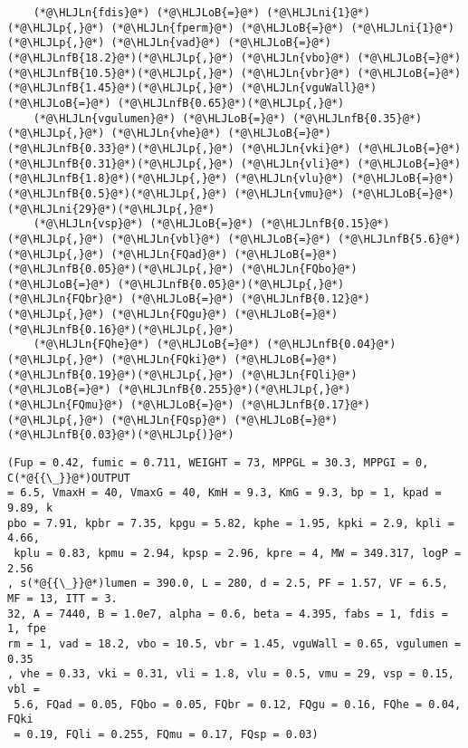 \documentclass[12pt,a4paper]{article}
\newcommand{\HLJLn}[1]{#1}
\newcommand{\HLJLnfB}[1]{\textcolor[RGB]{59,151,46}{#1}}
\newcommand{\HLJLni}[1]{\textcolor[RGB]{59,151,46}{#1}}
\newcommand{\HLJLoB}[1]{\textcolor[RGB]{102,102,102}{\textbf{#1}}}
\newcommand{\HLJLp}[1]{#1}
\begin{document}
\begin{lstlisting}
    (*@\HLJLn{fdis}@*) (*@\HLJLoB{=}@*) (*@\HLJLni{1}@*)(*@\HLJLp{,}@*) (*@\HLJLn{fperm}@*) (*@\HLJLoB{=}@*) (*@\HLJLni{1}@*)(*@\HLJLp{,}@*) (*@\HLJLn{vad}@*) (*@\HLJLoB{=}@*) (*@\HLJLnfB{18.2}@*)(*@\HLJLp{,}@*) (*@\HLJLn{vbo}@*) (*@\HLJLoB{=}@*) (*@\HLJLnfB{10.5}@*)(*@\HLJLp{,}@*) (*@\HLJLn{vbr}@*) (*@\HLJLoB{=}@*) (*@\HLJLnfB{1.45}@*)(*@\HLJLp{,}@*) (*@\HLJLn{vguWall}@*) (*@\HLJLoB{=}@*) (*@\HLJLnfB{0.65}@*)(*@\HLJLp{,}@*)
    (*@\HLJLn{vgulumen}@*) (*@\HLJLoB{=}@*) (*@\HLJLnfB{0.35}@*)(*@\HLJLp{,}@*) (*@\HLJLn{vhe}@*) (*@\HLJLoB{=}@*) (*@\HLJLnfB{0.33}@*)(*@\HLJLp{,}@*) (*@\HLJLn{vki}@*) (*@\HLJLoB{=}@*) (*@\HLJLnfB{0.31}@*)(*@\HLJLp{,}@*) (*@\HLJLn{vli}@*) (*@\HLJLoB{=}@*) (*@\HLJLnfB{1.8}@*)(*@\HLJLp{,}@*) (*@\HLJLn{vlu}@*) (*@\HLJLoB{=}@*) (*@\HLJLnfB{0.5}@*)(*@\HLJLp{,}@*) (*@\HLJLn{vmu}@*) (*@\HLJLoB{=}@*) (*@\HLJLni{29}@*)(*@\HLJLp{,}@*)
    (*@\HLJLn{vsp}@*) (*@\HLJLoB{=}@*) (*@\HLJLnfB{0.15}@*)(*@\HLJLp{,}@*) (*@\HLJLn{vbl}@*) (*@\HLJLoB{=}@*) (*@\HLJLnfB{5.6}@*)(*@\HLJLp{,}@*) (*@\HLJLn{FQad}@*) (*@\HLJLoB{=}@*) (*@\HLJLnfB{0.05}@*)(*@\HLJLp{,}@*) (*@\HLJLn{FQbo}@*) (*@\HLJLoB{=}@*) (*@\HLJLnfB{0.05}@*)(*@\HLJLp{,}@*) (*@\HLJLn{FQbr}@*) (*@\HLJLoB{=}@*) (*@\HLJLnfB{0.12}@*)(*@\HLJLp{,}@*) (*@\HLJLn{FQgu}@*) (*@\HLJLoB{=}@*) (*@\HLJLnfB{0.16}@*)(*@\HLJLp{,}@*)
    (*@\HLJLn{FQhe}@*) (*@\HLJLoB{=}@*) (*@\HLJLnfB{0.04}@*)(*@\HLJLp{,}@*) (*@\HLJLn{FQki}@*) (*@\HLJLoB{=}@*) (*@\HLJLnfB{0.19}@*)(*@\HLJLp{,}@*) (*@\HLJLn{FQli}@*) (*@\HLJLoB{=}@*) (*@\HLJLnfB{0.255}@*)(*@\HLJLp{,}@*) (*@\HLJLn{FQmu}@*) (*@\HLJLoB{=}@*) (*@\HLJLnfB{0.17}@*)(*@\HLJLp{,}@*) (*@\HLJLn{FQsp}@*) (*@\HLJLoB{=}@*) (*@\HLJLnfB{0.03}@*)(*@\HLJLp{)}@*)
\end{lstlisting}

\begin{lstlisting}
(Fup = 0.42, fumic = 0.711, WEIGHT = 73, MPPGL = 30.3, MPPGI = 0, C(*@{{\_}}@*)OUTPUT 
= 6.5, VmaxH = 40, VmaxG = 40, KmH = 9.3, KmG = 9.3, bp = 1, kpad = 9.89, k
pbo = 7.91, kpbr = 7.35, kpgu = 5.82, kphe = 1.95, kpki = 2.9, kpli = 4.66,
 kplu = 0.83, kpmu = 2.94, kpsp = 2.96, kpre = 4, MW = 349.317, logP = 2.56
, s(*@{{\_}}@*)lumen = 390.0, L = 280, d = 2.5, PF = 1.57, VF = 6.5, MF = 13, ITT = 3.
32, A = 7440, B = 1.0e7, alpha = 0.6, beta = 4.395, fabs = 1, fdis = 1, fpe
rm = 1, vad = 18.2, vbo = 10.5, vbr = 1.45, vguWall = 0.65, vgulumen = 0.35
, vhe = 0.33, vki = 0.31, vli = 1.8, vlu = 0.5, vmu = 29, vsp = 0.15, vbl =
 5.6, FQad = 0.05, FQbo = 0.05, FQbr = 0.12, FQgu = 0.16, FQhe = 0.04, FQki
 = 0.19, FQli = 0.255, FQmu = 0.17, FQsp = 0.03)
\end{lstlisting}
\end{document}
